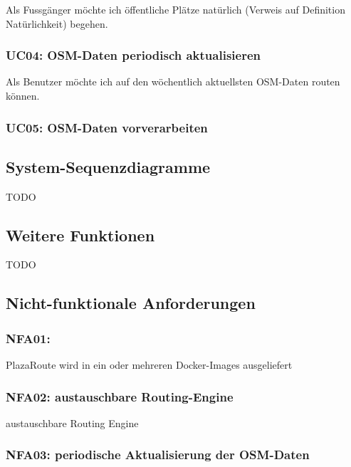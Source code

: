 Als Fussgänger möchte ich öffentliche Plätze natürlich (Verweis auf Definition Natürlichkeit) begehen.


\subsubsection{UC04: OSM-Daten periodisch aktualisieren}
\label{usecase:UC04}

Als Benutzer möchte ich auf den wöchentlich aktuellsten \ac{OSM}-Daten routen können.

\subsubsection{UC05: OSM-Daten vorverarbeiten}
\label{usecase:UC05}

\subsection{System-Sequenzdiagramme}
\label{sub:System-Sequenzdiagramme}

TODO

\subsection{Weitere Funktionen}
\label{sub:Weitere Funktionen}

TODO

\subsection{Nicht-funktionale Anforderungen}
\label{sub:Nicht-funktionale Anforderungen}

\subsubsection{NFA01: }
\label{NFA:NFA01}

PlazaRoute wird in ein oder mehreren Docker-Images ausgeliefert

\subsubsection{NFA02: austauschbare Routing-Engine}
\label{NFA:NFA02}

austauschbare Routing Engine

\subsubsection{NFA03: periodische Aktualisierung der OSM-Daten}
\label{NFA:NFA03}

